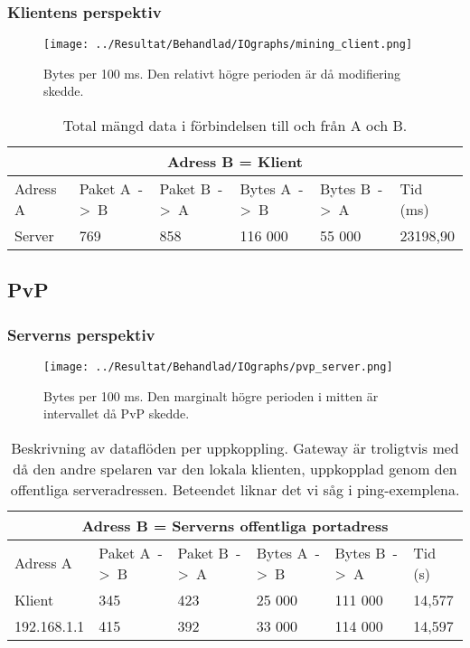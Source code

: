 \documentclass[journal,comsoc]{IEEEtran}
\begin{document}
\subsubsection{Klientens perspektiv}
\begin{figure} [H]
  \centering
  \texttt{[image: ../Resultat/Behandlad/IOgraphs/mining\_client.png]}
  \caption{Bytes per 100 ms. Den relativt högre perioden är då modifiering skedde.}
  \label{fig:client:modify}
\end{figure}
\begin{table} [H]
  \begin{center}
    \label{table:client:modify}
    \begin{tabular}{ | m{1.5cm} |  m{1cm} | m{1cm}| m{1cm}|m{1cm}|m{0.5cm}| } 
      \hline
      \multicolumn{6}{|c|}{Adress B = Klient} \\
      \hline
      Adress A & Paket A~->~B & Paket B~->~A & Bytes A~->~B & Bytes B~->~A & Tid (ms) \\
      \hline
      Server & 769 & 858 & 116 000 & 55 000 & 23198,90 \\
      \hline 
    \end{tabular}
  \end{center}
  \caption{Total mängd data i förbindelsen till och från A och B.}
\end{table}
\subsection{PvP}
\subsubsection{Serverns perspektiv}
\begin{figure} [H]
  \centering
  \texttt{[image: ../Resultat/Behandlad/IOgraphs/pvp\_server.png]}
  \caption{Bytes per 100 ms. Den marginalt högre perioden i mitten är intervallet då PvP skedde.}
  \label{fig:server:pvp}
\end{figure}
\begin{table} [H]
  \begin{center}
    \label{table:server:pvp}
    \begin{tabular}{ | m{1.5cm} |  m{1cm} | m{1cm}| m{1cm}|m{1cm}|m{0.75cm}| } 
      \hline
      \multicolumn{6}{|c|}{Adress B = Serverns offentliga portadress} \\
      \hline
      Adress A & Paket A~->~B & Paket B~->~A & Bytes A~->~B & Bytes B~->~A & Tid (s) \\
      \hline
      Klient & 345 & 423 & 25 000 & 111 000 & 14,577 \\
      \hline
      192.168.1.1 & 415 & 392 & 33 000 & 114 000 & 14,597 \\
      \hline 
    \end{tabular}
  \end{center}
  \caption{Beskrivning av dataflöden per uppkoppling. Gateway är troligtvis med då den andre spelaren var den lokala klienten, uppkopplad genom den offentliga serveradressen. Beteendet liknar det vi såg i ping-exemplena.}
\end{table}
\end{document}
